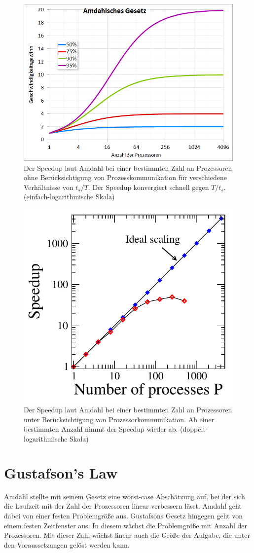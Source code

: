 		\begin{figure}[h]
		\centering
    		\includegraphics[height=0.5\textwidth]{chapter1/pictures/Amdahl.png}
    		\caption[Speedup laut Amdahl ohne Prozesskommunikation]{Der Speedup laut Amdahl bei einer bestimmten Zahl an Prozessoren ohne Berücksichtigung von Prozesskommunikation für verschiedene Verhältnisse von $t_s/T$. Der Speedup konvergiert schnell gegen $T/t_s$. (einfach-logarithmische Skala) \autocite{wikiAmdahl}}
    		\label{1:am}
		\end{figure}
		
		\begin{figure}[h]
		\centering
    		\includegraphics[height=0.4\textwidth]{chapter1/pictures/Amdahl_praxis.png}
    		\caption[Speedup laut Amdahl mit Prozesskommunikation]{Der Speedup laut Amdahl bei einer bestimmten Zahl an Prozessoren unter Berücksichtigung von Prozessorkommunikation. Ab einer bestimmten Anzahl nimmt der Speedup wieder ab. (doppelt-logarithmische Skala) \autocite{carch}}
    		\label{1:am_prax}
		\end{figure}

		\newpage

		\section{Gustafson's Law}
		Amdahl stellte mit seinem Gesetz eine worst-case Abschätzung auf, bei der sich die Laufzeit mit der Zahl der Prozessoren linear verbessern lässt. Amdahl geht dabei von einer festen Problemgröße aus. Gustafsons Gesetz hingegen geht von einem festen Zeitfenster aus. In diesem wächst die Problemgröße mit Anzahl der Prozessoren. Mit dieser Zahl wächst linear auch die Größe der Aufgabe, die unter den Voraussetzungen gelöst werden kann.

